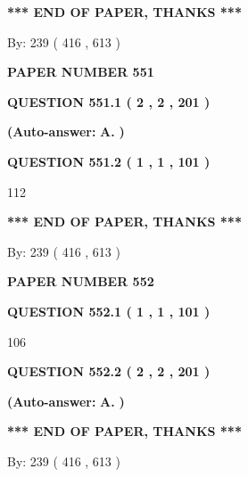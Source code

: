 \documentclass{ctexart}
\begin{document}
 
   
   
   
   
\vspace{1.0in} 
{\textbf{\large{ *** END OF PAPER, THANKS *** }}} 
   
   
\hspace{1.0in} By: 
 239 ( 416 ,  613 )
   
   
   
   
\newpage 
\setcounter{page}{ 
   551001 } 
   
   
 {\textbf{ \Large{ PAPER NUMBER  551  }}}
   
   
   
   
  
  
{\textbf{\large{QUESTION
551.1 
 ( 2 , 2 , 201 )
}}}
 
 
{\textbf{(Auto-answer:}}
{\textbf{\large{
A.}}}
{\textbf{)}}
 
 
  
  
{\textbf{\large{QUESTION
551.2 
 ( 1 , 1 , 101 )
}}}

112
   
   
   
   
\vspace{1.0in} 
{\textbf{\large{ *** END OF PAPER, THANKS *** }}} 
   
   
\hspace{1.0in} By: 
 239 ( 416 ,  613 )
   
   
   
   
\newpage 
\setcounter{page}{ 
   552001 } 
   
   
 {\textbf{ \Large{ PAPER NUMBER  552  }}}
   
   
   
   
  
  
{\textbf{\large{QUESTION
552.1 
 ( 1 , 1 , 101 )
}}}

106
  
  
{\textbf{\large{QUESTION
552.2 
 ( 2 , 2 , 201 )
}}}
 
 
{\textbf{(Auto-answer:}}
{\textbf{\large{
A.}}}
{\textbf{)}}
 
 
   
   
   
   
\vspace{1.0in} 
{\textbf{\large{ *** END OF PAPER, THANKS *** }}} 
   
   
\hspace{1.0in} By: 
 239 ( 416 ,  613 )
   
   
   
   
\newpage 
\setcounter{page}{ 
   553001 } 
   
\end{document}

